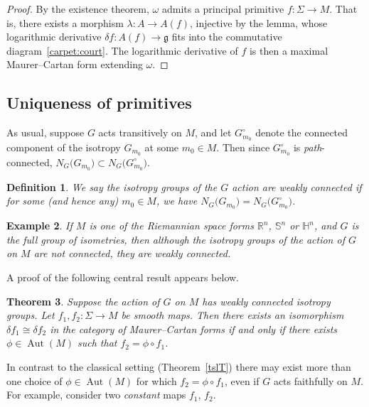 \documentclass[pdftex]{sigma}%
\numberwithin{equation}{section}
\newtheorem{Theorem}{Theorem}[section]
\newtheorem{Definition}[Theorem]{Definition}
\newtheorem{Example}[Theorem]{Example}
\DeclareMathOperator{\automorphism}{Aut}
\begin{document}
\begin{proof} By the existence theorem, $\omega $ admits a principal
 primitive $f \colon\! \Sigma \rightarrow M$. That is, there exists a
 morphism $\lambda \colon\! A \rightarrow A(f)$, injective by the
 lemma, whose logarithmic derivative
 $\delta f \colon\! A(f) \rightarrow {\mathfrak g} $ fits into the
 commutative diagram~\eqref{carpet:court}. The logarithmic
 derivative of $f$ is then a maximal Maurer--Cartan form extending
 $\omega $.
\end{proof}

\subsection*{Uniqueness of primitives}%

As usual, suppose $G$ acts transitively on $M$, and let
$G_{m_0}^\circ $ denote the connected component of the isotropy
$G_{m_0}$ at some $m_0 \in M$. Then since $G_{m_0}^\circ$ is {\em
 path}-connected, $N_G\big(G_{m_0}\big)\subset N_G\big(G_{m_0}^\circ\big)$.
\begin{Definition}%
 We say the isotropy groups of the $G$ action are {\it weakly
 connected} if for some (and hence any) $m_0 \in M$, we have
 $N_G\big(G_{m_0}\big)=N_G\big(G_{m_0}^\circ\big)$.
\end{Definition}

\begin{Example} If $M $ is one of the Riemannian space forms ${\mathbb
R}^n$, ${\mathbb S}^n$ or ${\mathbb H}^n $, and $G$ is the full group of
isometries, then although the isotropy groups of the action of $G$ on
$M$ are not connected, they {\em are} weakly connected.
\end{Example}
A proof of the following central result appears below.

\begin{Theorem}\label{uniquenessT}
 Suppose the action of $G$ on $M$ has weakly connected isotropy
 groups. Let $f_1, f_2 \colon \Sigma \rightarrow M$ be smooth
 maps. Then there exists an isomorphism $\delta f_1 \cong \delta f_2$
 in the category of Maurer--Cartan forms {\em if and only if} there
 exists $\phi \in \automorphism(M)$ such that
 $f_2 = \phi \circ f_1$.
\end{Theorem}

In contrast to the classical setting (Theorem~\ref{tslT})
there may exist more than one choice of $\phi \in \automorphism(M)$
for which $f_2 = \phi \circ f_1$, even if $G$ acts faithfully on
$M$. For example, consider two {\em constant} maps $f_1$, $f_2$.
\end{document}

